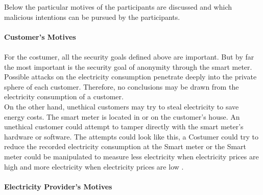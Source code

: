 Below the particular motives of the participants are discussed and which malicious intentions can be pursued by the participants.
\\
\\
\textbf{Customer's Motives}
\\
\\
For the costumer, all the security goals defined above are important. But by far the most important is the security goal of anonymity through the smart meter. Possible attacks on the electricity consumption penetrate deeply into the private sphere of each customer. Therefore, no conclusions may be drawn from the electricity consumption of a customer.\\
On the other hand, unethical customers may try to steal electricity to save energy costs. The smart meter is located in or on the customer's house. An unethical customer could attempt to tamper directly with the smart meter's hardware or software. The attempts could look like this, a Costumer could try to reduce the recorded electricity consumption at the Smart meter or the Smart meter could be manipulated to measure less electricity when electricity prices are high and more electricity when electricity prices are low \cite{lemay2007unified}.
\\
\\
\textbf{Electricity Provider's Motives}
\\
\\
